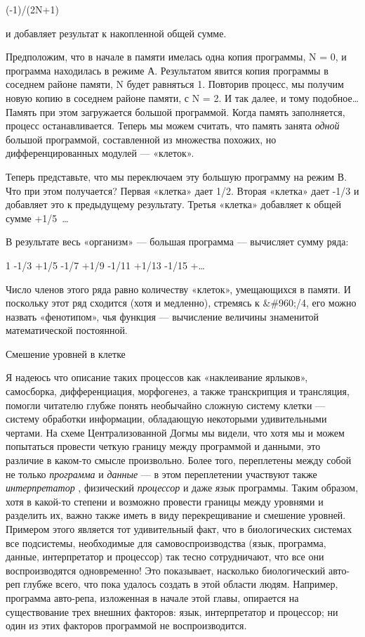 \documentclass[../main.tex]{subfiles}
\begin{document}
(-1)/(2N+1)

и добавляет результат к накопленной общей сумме.

Предположим, что в начале в памяти имелась одна копия программы, N = 0, и программа находилась в режиме А. Результатом явится копия программы в соседнем районе памяти, N будет равняться 1. Повторив процесс, мы получим новую копию в соседнем районе памяти, с N = 2. И так далее, и тому подобное\ldots{} Память при этом загружается большой программой. Когда память заполняется, процесс останавливается. Теперь мы можем считать, что память занята \emph{одной} большой программой, составленной из множества похожих, но дифференцированных модулей --- «клеток».

Теперь представьте, что мы переключаем эту большую программу на режим В. Что при этом получается? Первая «клетка» дает 1/2. Вторая «клетка» дает -1/3 и добавляет это к предыдущему результату. Третья «клетка» добавляет к общей сумме +1/5~\ldots{}

В результате весь «организм» --- большая программа --- вычисляет сумму ряда:

1 -1/3 +1/5 -1/7 +1/9 -1/11 +1/13 -1/15 +\ldots{}

Число членов этого ряда равно количеству «клеток», умещающихся в памяти. И поскольку этот ряд сходится (хотя и медленно), стремясь к \&\#960;/4, его можно назвать «фенотипом», чья функция --- вычисление величины знаменитой математической постоянной.

Смешение уровней в клетке

Я надеюсь что описание таких процессов как «наклеивание ярлыков», самосборка, дифференциация, морфогенез, а также транскрипция и трансляция, помогли читателю глубже понять необычайно сложную систему клетки --- систему обработки информации, обладающую некоторыми удивительными чертами. На схеме Централизованной Догмы мы видели, что хотя мы и можем попытаться провести четкую границу между программой и данными, это различие в каком-то смысле произвольно. Более того, переплетены между собой не только \emph{программа} и \emph{данные} --- в этом переплетении участвуют также \emph{интерпретатор} , физический \emph{процессор} и даже \emph{язык} программы. Таким образом, хотя в какой-то степени и возможно провести границы между уровнями и разделить их, важно также иметь в виду перекрещивание и смешение уровней. Примером этого является тот удивительный факт, что в биологических системах все подсистемы, необходимые для самовоспроизводства (язык, программа, данные, интерпретатор и процессор) так тесно сотрудничают, что все они воспроизводятся одновременно! Это показывает, насколько биологический авто-реп глубже всего, что пока удалось создать в этой области людям. Например, программа авто-репа, изложенная в начале этой главы, опирается на существование трех внешних факторов: язык, интерпретатор и процессор; ни один из этих факторов программой не воспроизводится.
\end{document}
